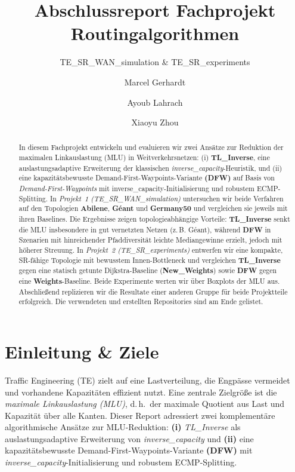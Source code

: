 \documentclass[sigconf,nonacm,review]{acmart}
\title{Abschlussreport Fachprojekt Routingalgorithmen}
\subtitle{TE\_SR\_WAN\_simulation \& TE\_SR\_experiments}
\author{Marcel Gerhardt}
\affiliation{\institution{TU Dortmund}\city{}\country{}}
\author{Ayoub Lahrach}
\affiliation{\institution{TU Dortmund}\city{}\country{}}
\author{Xiaoyu Zhou}
\affiliation{\institution{TU Dortmund}\city{}\country{}}
\begin{document}
\begin{abstract}
In diesem Fachprojekt entwickeln und evaluieren wir zwei Ansätze zur Reduktion der maximalen Linkauslastung (MLU) in Weitverkehrsnetzen: (i) \textbf{TL\_Inverse}, eine auslastungsadaptive Erweiterung der klassischen \emph{inverse\_capacity}-Heuristik, und (ii) eine kapazitätsbewusste Demand-First-Waypoints-Variante \textbf{(DFW)} auf Basis von \emph{Demand-First-Waypoints} mit inverse\_capacity-Initialisierung und robustem ECMP-Splitting. In \textit{Projekt~1 (TE\_SR\_WAN\_simulation)} untersuchen wir beide Verfahren auf den Topologien \textbf{Abilene}, \textbf{Géant} und \textbf{Germany50} und vergleichen sie jeweils mit ihren Baselines. Die Ergebnisse zeigen topologieabhängige Vorteile: \textbf{TL\_Inverse} senkt die MLU insbesondere in gut vernetzten Netzen (z.\,B. Géant), während \textbf{DFW} in Szenarien mit hinreichender Pfaddiversität leichte Mediangewinne erzielt, jedoch mit höherer Streuung. In \textit{Projekt~2 (TE\_SR\_experiments)} entwerfen wir eine kompakte, SR-fähige Topologie mit bewusstem Innen-Bottleneck und vergleichen \textbf{TL\_Inverse} gegen eine statisch getunte Dijkstra-Baseline (\textbf{New\_Weights}) sowie \textbf{DFW} gegen eine \textbf{Weights}-Baseline. Beide Experimente werten wir über Boxplots der MLU aus. Abschließend replizieren wir die Resultate einer anderen Gruppe für beide Projektteile erfolgreich. Die verwendeten und erstellten Repositories sind am Ende gelistet.
\end{abstract}

\maketitle


\section{Einleitung \& Ziele}
Traffic Engineering (TE) zielt auf eine Lastverteilung, die Engpässe vermeidet und vorhandene Kapazitäten effizient nutzt. Eine zentrale Zielgröße ist die \emph{maximale Linkauslastung (MLU)}, d.\,h.\ der maximale Quotient aus Last und Kapazität über alle Kanten. Dieser Report adressiert zwei komplementäre algorithmische Ansätze zur MLU-Reduktion: \textbf{(i)} \emph{TL\_Inverse} als auslastungsadaptive Erweiterung von \emph{inverse\_capacity} und \textbf{(ii)} eine kapazitätsbewusste Demand-First-Waypoints-Variante \textbf{(DFW)} mit \emph{inverse\_capacity}-Initialisierung und robustem ECMP-Splitting.
\end{document}
